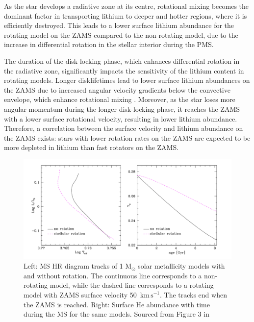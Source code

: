 As the star develops a radiative zone at its centre, rotational mixing becomes the dominant factor in transporting lithium to deeper and hotter regions, where it is efficiently destroyed. 
This leads to a lower surface lithium abundance for the rotating model on the ZAMS compared to the non-rotating model, due to the increase in differential rotation in the stellar interior during the PMS.

The duration of the disk-locking phase, which enhances differential rotation in the radiative zone, significantly impacts the sensitivity of the lithium content in rotating models. 
Longer disklifetimes lead to lower surface lithium abundances on the ZAMS due to increased angular velocity gradients below the convective envelope, which enhance rotational mixing \citep{eggenberger_angular_2012}.
Moreover, as the star loses more angular momentum during the longer disk-locking phase, it reaches the ZAMS with a lower surface rotational velocity, resulting in lower lithium abundance.
Therefore, a correlation between the surface velocity and lithium abundance on the ZAMS exists: stars with lower rotation rates on the ZAMS are expected to be more depleted in lithium than fast rotators on the ZAMS.

\begin{figure}[h]
    \includegraphics[width=\textwidth]{Figures/intro_figures/MS_effect.png}
    \caption[Effect of rotation of main-sequence evoltuon of a stars 1 $M_{\odot}$.]{Left: MS HR diagram tracks of 1 M$_{\odot}$ solar metallicity models with and without rotation. The continuous line corresponds to a non-rotating model, while the dashed line corresponds to a rotating model with ZAMS surface velocity 50 $\,\mathrm{km\,s}^{-1}$. The tracks end when the ZAMS is reached. Right: Surface He abundance with time during the MS for the same models. Sourced from Figure 3 in \citet{eggenberger_rotation_2013}}
    \label{fig:ms_effect}
\end{figure}

